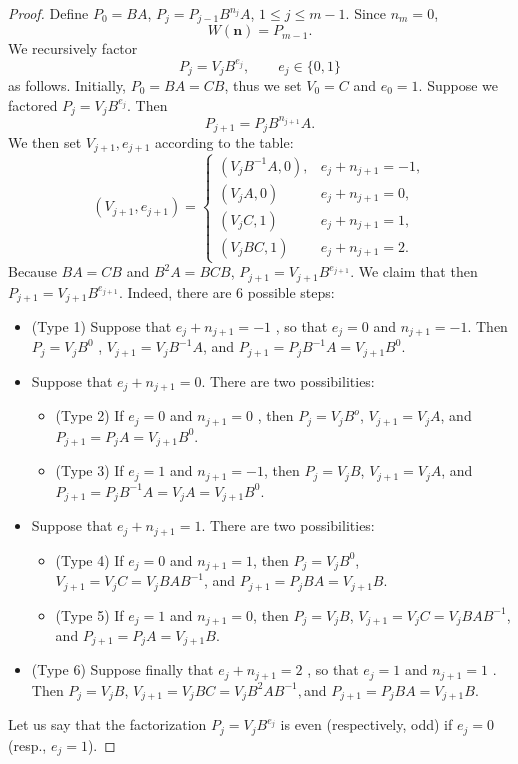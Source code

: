 \documentclass[10pt,a4paper]{amsart}
\begin{document}
\begin{proof}
Define $P_{0}=BA$, $P_{j}=P_{j-1}B^{n_{j}}A$, $1\leq j\leq m-1$.
Since $n_{m}=0$,
\[
W(\mathbf{n})=P_{m-1}.
\]
We recursively factor
\[
P_{j}=V_{j}B^{e_{j}},\qquad e_{j}\in\{0,1\}
\]
as follows. Initially, $P_{0}=BA=CB$, thus we set $V_{0}=C$ and
$e_{0}=1$. Suppose we factored $P_{j}=V_{j}B^{e_{j}}$. Then
\[
P_{j+1}=P_{j}B^{n_{j+1}}A.
\]
We then set $V_{j+1},e_{j+1}$ according to the table:
\[
(V_{j+1},e_{j+1})=\begin{cases}
(V_{j}B^{-1}A,0), & e_{j}+n_{j+1}=-1,\\
(V_{j}A,0) & e_{j}+n_{j+1}=0,\\
(V_{j}C,1) & e_{j}+n_{j+1}=1,\\
(V_{j}BC,1) & e_{j}+n_{j+1}=2.
\end{cases}
\]
Because $BA=CB$ and $B^{2}A=BCB$, $P_{j+1}=V_{j+1}B^{e_{j+1}}$.
We claim that then $P_{j+1}=V_{j+1}B^{e_{j+1}}$. Indeed, there are
6 possible steps:
\begin{itemize}
\item (Type 1) Suppose that $e_{j}+n_{j+1}=-1$ , so that $e_{j}=0$ and
$n_{j+1}=-1$. Then $P_{j}=V_{j}B^{0}$ , $V_{j+1}=V_{j}B^{-1}A$,
and $P_{j+1}=P_{j}B^{-1}A=V_{j+1}B^{0}$.
\item Suppose that $e_{j}+n_{j+1}=0$. There are two possibilities:
\begin{itemize}
\item (Type 2) If $e_{j}=0$ and $n_{j+1}=0$ , then $P_{j}=V_{j}B^{o}$,
$V_{j+1}=V_{j}A$, and $P_{j+1}=P_{j}A=V_{j+1}B^{0}.$
\item (Type 3) If $e_{j}=1$ and $n_{j+1}=-1$, then $P_{j}=V_{j}B$, $V_{j+1}=V_{j}A$,
and $P_{j+1}=P_{j}B^{-1}A=V_{j}A=V_{j+1}B^{0}.$
\end{itemize}
\item Suppose that $e_{j}+n_{j+1}=1$. There are two possibilities:
\begin{itemize}
\item (Type 4) If $e_{j}=0$ and $n_{j+1}=1$, then $P_{j}=V_{j}B^{0}$,
$V_{j+1}=V_{j}C=V_{j}BAB^{-1}$, and $P_{j+1}=P_{j}BA=V_{j+1}B.$
\item (Type 5) If $e_{j}=1$ and $n_{j+1}=0$, then $P_{j}=V_{j}B$, $V_{j+1}=V_{j}C=V_{j}BAB^{-1}$,
and $P_{j+1}=P_{j}A=V_{j+1}B.$
\end{itemize}
\item (Type 6) Suppose finally that $e_{j}+n_{j+1}=2$ , so that $e_{j}=1$
and $n_{j+1}=1$ . Then $P_{j}=V_{j}B$, $V_{j+1}=V_{j}BC=V_{j}B^{2}AB^{-1},$and
$P_{j+1}=P_{j}BA=V_{j+1}B.$
\end{itemize}
Let us say that the factorization $P_{j}=V_{j}B^{e_{j}}$ is even
(respectively, odd) if $e_{j}=0$ (resp., $e_{j}=1$).


\end{proof}
\end{document}
